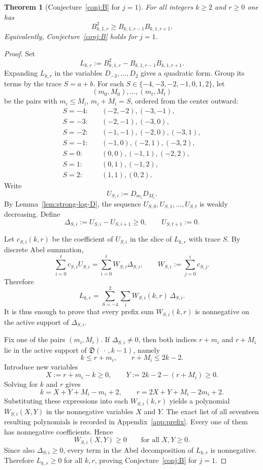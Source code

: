 \documentclass[11pt]{amsart}
\numberwithin{equation}{section}
\newtheorem{theorem}{Theorem}[section]
\theoremstyle{remark}
\newcommand{\Dder}{\mathfrak D}
\begin{document}
\begin{theorem}[Conjecture~\ref{conj:B} for $j=1$]\label{thm:B1-solved}
For all integers $k\ge2$ and $r\ge0$ one has
\[
  B_{k,1,r}^2\ge B_{k,1,r-1}B_{k,1,r+1}.
\]
Equivalently, Conjecture~\ref{conj:B} holds for $j=1$.
\end{theorem}

\begin{proof}
Set
\[
  L_{k,r}:=B_{k,1,r}^2-B_{k,1,r-1}B_{k,1,r+1}.
\]
Expanding $L_{k,r}$ in the variables $D_{-3},\ldots,D_2$ gives a quadratic form.  Group its terms by the trace $S=a+b$.  For each $S\in\{-4,-3,-2,-1,0,1,2\}$, let
\[
  (m_0,M_0),\ldots,(m_t,M_t)
\]
be the pairs with $m_i\le M_i$, $m_i+M_i=S$, ordered from the center outward:
\begin{align*}
S=-4:&\quad (-2,-2),(-3,-1),\\
S=-3:&\quad (-2,-1),(-3,0),\\
S=-2:&\quad (-1,-1),(-2,0),(-3,1),\\
S=-1:&\quad (-1,0),(-2,1),(-3,2),\\
S=0:&\quad (0,0),(-1,1),(-2,2),\\
S=1:&\quad (0,1),(-1,2),\\
S=2:&\quad (1,1),(0,2).
\end{align*}
Write
\[
  U_{S,i}:=D_{m_i}D_{M_i}.
\]
By Lemma~\ref{lem:strong-log-D}, the sequence $U_{S,0},U_{S,1},\ldots,U_{S,t}$ is weakly decreasing.  Define
\[
  \Delta_{S,i}:=U_{S,i}-U_{S,i+1}\ge0,
\qquad
  U_{S,t+1}:=0.
\]

Let $c_{S,i}(k,r)$ be the coefficient of $U_{S,i}$ in the slice of $L_{k,r}$ with trace $S$.  By discrete Abel summation,
\[
  \sum_{i=0}^{t} c_{S,i}U_{S,i}
  =
  \sum_{i=0}^{t} W_{S,i}\Delta_{S,i},
  \qquad
  W_{S,i}:=\sum_{j=0}^{i} c_{S,j}.
\]
Therefore
\[
  L_{k,r}=\sum_{S=-4}^{2}\sum_i W_{S,i}(k,r)\,\Delta_{S,i}.
\]
It is thus enough to prove that every prefix sum $W_{S,i}(k,r)$ is nonnegative on the active support of $\Delta_{S,i}$.

Fix one of the pairs $(m_i,M_i)$.  If $\Delta_{S,i}\neq0$, then both indices $r+m_i$ and $r+M_i$ lie in the active support of $\Dder(\,\cdot\,,k-1)$, namely
\[
  k\le r+m_i,\qquad r+M_i\le 2k-2.
\]
Introduce new variables
\[
  X:=r+m_i-k\ge0,\qquad Y:=2k-2-(r+M_i)\ge0.
\]
Solving for $k$ and $r$ gives
\[
  k=X+Y+M_i-m_i+2,\qquad
  r=2X+Y+M_i-2m_i+2.
\]
Substituting these expressions into each $W_{S,i}(k,r)$ yields a polynomial $W_{S,i}(X,Y)$ in the nonnegative variables $X$ and $Y$.  The exact list of all seventeen resulting polynomials is recorded in Appendix~\ref{app:prefix}.  Every one of them has nonnegative coefficients.  Hence
\[
  W_{S,i}(X,Y)\ge0
  \qquad
  \text{for all }X,Y\ge0.
\]
Since also $\Delta_{S,i}\ge0$, every term in the Abel decomposition of $L_{k,r}$ is nonnegative.  Therefore $L_{k,r}\ge0$ for all $k,r$, proving Conjecture~\ref{conj:B} for $j=1$.
\end{proof}
\end{document}
